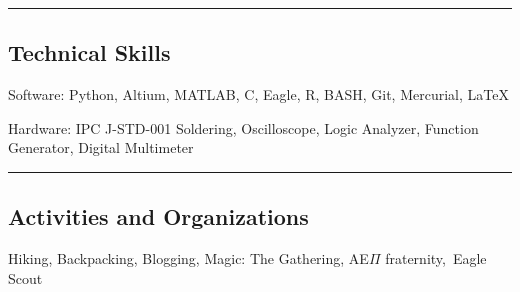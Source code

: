 \documentclass[10pt,letterpaper]{article}
\newenvironment{indentsection}[1]%
{\begin{list}{}%
	{\setlength{\leftmargin}{#1}}%
	\item[]%
}
{\end{list}}
\begin{document}
\hrule
\vspace{-0.4em}
\subsection*{Technical Skills}

\begin{description*}
	\item[Software:]
	 Python, Altium, MATLAB, C, Eagle, R, BASH, Git, Mercurial, \LaTeX
	\item[Hardware:]
	IPC J-STD-001 Soldering, Oscilloscope, Logic Analyzer, Function Generator, Digital Multimeter
\end{description*}

\hrule
\vspace{-0.4em}
\subsection*{Activities and Organizations}
\indent Hiking, Backpacking, Blogging, Magic: The Gathering, AE$\Pi$ fraternity,\, Eagle Scout
\end{document}
